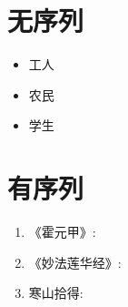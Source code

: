 \section{无序列}
\begin{itemize}
	\item 工人
	\item 农民 
	\item 学生 
\end{itemize}

\section{有序列}
\begin{enumerate}
	\item 《霍元甲》:  
	\item   《妙法莲华经》:  
	\item    寒山拾得: 
\end{enumerate}
